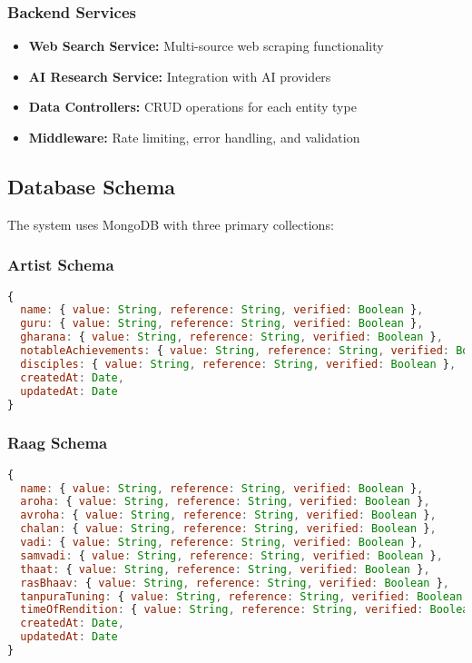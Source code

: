 \documentclass[12pt,a4paper]{article}
\begin{document}
\subsubsection{Backend Services}

\begin{itemize}
    \item \textbf{Web Search Service:} Multi-source web scraping functionality
    \item \textbf{AI Research Service:} Integration with AI providers
    \item \textbf{Data Controllers:} CRUD operations for each entity type
    \item \textbf{Middleware:} Rate limiting, error handling, and validation
\end{itemize}

\subsection{Database Schema}

The system uses MongoDB with three primary collections:

\subsubsection{Artist Schema}
\begin{lstlisting}[language=JavaScript]
{
  name: { value: String, reference: String, verified: Boolean },
  guru: { value: String, reference: String, verified: Boolean },
  gharana: { value: String, reference: String, verified: Boolean },
  notableAchievements: { value: String, reference: String, verified: Boolean },
  disciples: { value: String, reference: String, verified: Boolean },
  createdAt: Date,
  updatedAt: Date
}
\end{lstlisting}

\subsubsection{Raag Schema}
\begin{lstlisting}[language=JavaScript]
{
  name: { value: String, reference: String, verified: Boolean },
  aroha: { value: String, reference: String, verified: Boolean },
  avroha: { value: String, reference: String, verified: Boolean },
  chalan: { value: String, reference: String, verified: Boolean },
  vadi: { value: String, reference: String, verified: Boolean },
  samvadi: { value: String, reference: String, verified: Boolean },
  thaat: { value: String, reference: String, verified: Boolean },
  rasBhaav: { value: String, reference: String, verified: Boolean },
  tanpuraTuning: { value: String, reference: String, verified: Boolean },
  timeOfRendition: { value: String, reference: String, verified: Boolean },
  createdAt: Date,
  updatedAt: Date
}
\end{lstlisting}
\end{document}
